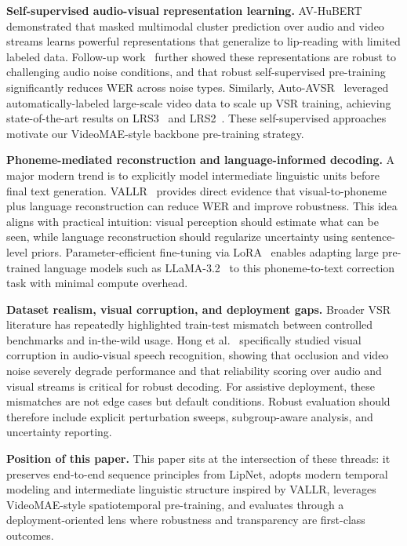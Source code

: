 \documentclass[10pt,twocolumn,letterpaper]{article}
\begin{document}
\textbf{Self-supervised audio-visual representation learning.}
AV-HuBERT~\cite{shi2022avhubert} demonstrated that masked multimodal cluster prediction over audio and video streams learns powerful representations that generalize to lip-reading with limited labeled data. Follow-up work~\cite{shi2022robust} further showed these representations are robust to challenging audio noise conditions, and that robust self-supervised pre-training significantly reduces WER across noise types. Similarly, Auto-AVSR~\cite{ma2023autoavsr} leveraged automatically-labeled large-scale video data to scale up VSR training, achieving state-of-the-art results on LRS3~\cite{afouras2018lrs3} and LRS2~\cite{afouras2018lrs2}. These self-supervised approaches motivate our VideoMAE-style backbone pre-training strategy.

\textbf{Phoneme-mediated reconstruction and language-informed decoding.}
A major modern trend is to explicitly model intermediate linguistic units before final text generation. VALLR~\cite{thomas2025vallr} provides direct evidence that visual-to-phoneme plus language reconstruction can reduce WER and improve robustness. This idea aligns with practical intuition: visual perception should estimate what can be seen, while language reconstruction should regularize uncertainty using sentence-level priors. Parameter-efficient fine-tuning via LoRA~\cite{hu2022lora} enables adapting large pre-trained language models such as LLaMA-3.2~\cite{meta2024llama32} to this phoneme-to-text correction task with minimal compute overhead.

\textbf{Dataset realism, visual corruption, and deployment gaps.}
Broader VSR literature has repeatedly highlighted train-test mismatch between controlled benchmarks and in-the-wild usage. Hong et al.~\cite{hong2023watchorlisten} specifically studied visual corruption in audio-visual speech recognition, showing that occlusion and video noise severely degrade performance and that reliability scoring over audio and visual streams is critical for robust decoding. For assistive deployment, these mismatches are not edge cases but default conditions. Robust evaluation should therefore include explicit perturbation sweeps, subgroup-aware analysis, and uncertainty reporting.

\textbf{Position of this paper.}
This paper sits at the intersection of these threads: it preserves end-to-end sequence principles from LipNet, adopts modern temporal modeling and intermediate linguistic structure inspired by VALLR, leverages VideoMAE-style spatiotemporal pre-training, and evaluates through a deployment-oriented lens where robustness and transparency are first-class outcomes.
\end{document}
